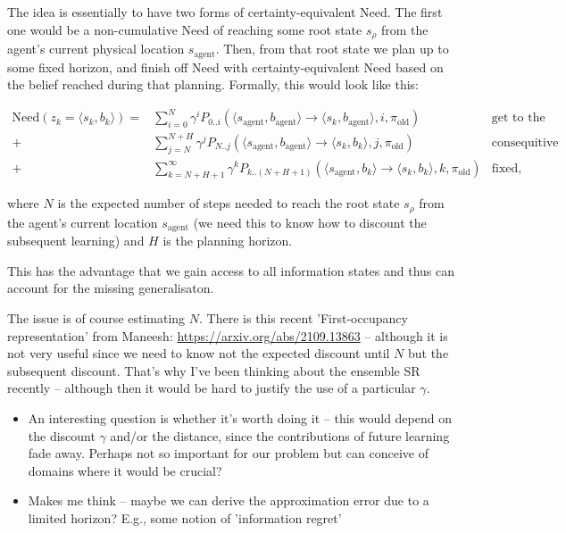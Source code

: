 \documentclass{article}
\newcommand{\old}{\text{old}}
\begin{document}
The idea is essentially to have two forms of certainty-equivalent Need. The first one would be a non-cumulative Need of reaching some root state $s_\rho$ 
from the agent's current physical location $s_\text{agent}$. Then, from that root state we plan up to some fixed horizon, and finish off Need with certainty-equivalent 
Need based on the belief reached during that planning. Formally, this would look like this:
\begin{linenomath}
\begin{align}
    \text{Need}(z_k=\langle s_k, b_k \rangle) = &\sum_{i=0}^{N} \gamma^i P_{0..i}(\langle s_\text{agent}, b_\text{agent} \rangle \rightarrow \langle s_k, b_\text{agent} \rangle, i, \pi_\old) & \text{get to the root, fixed belief} \nonumber \\
    + &\sum_{j=N}^{N+H} \gamma^j P_{N..j}(\langle s_\text{agent}, b_\text{agent} \rangle \rightarrow \langle s_k, b_k \rangle, j, \pi_\old) & \text{consequitive belief updates} \nonumber \\
    + &\sum_{k=N+H+1}^{\infty} \gamma^k P_{k..(N+H+1)}(\langle s_\text{agent}, b_k \rangle \rightarrow \langle s_k, b_k \rangle, k, \pi_\old) & \text{fixed, updated belief} \nonumber
\end{align}
\end{linenomath}
where $N$ is the expected number of steps needed to reach the root state $s_\rho$ from the agent's current location $s_\text{agent}$ (we need this to know 
how to discount the subsequent learning) and $H$ is the planning horizon.

\bigbreak

This has the advantage that we gain access to all information states and thus can account for the missing generalisaton.

\bigbreak

The issue is of course estimating $N$. There is this recent 'First-occupancy representation' 
from Maneesh: \url{https://arxiv.org/abs/2109.13863} -- although it is not very useful since we 
need to know not the expected discount until $N$ but the subsequent discount. That's why I've been thinking 
about the ensemble SR recently -- although then it would be hard to justify the use of a particular $\gamma$.

\bigbreak

\begin{itemize}
    \item An interesting question is whether it's worth doing it -- this would depend on the discount $\gamma$ and/or the distance, since the contributions of future learning fade away. 
    Perhaps not so important for our problem but can conceive of domains where it would be crucial?  
    \item Makes me think -- maybe we can derive the approximation error due to a limited horizon? E.g., some notion of 'information regret'
\end{itemize}
\end{document}
